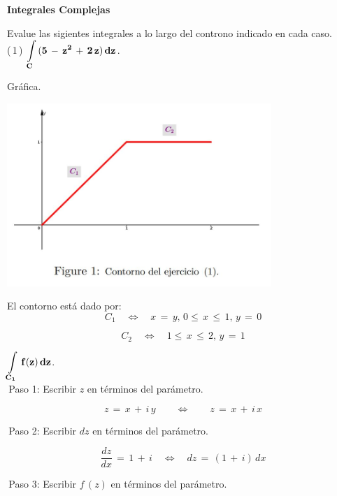 \documentclass[a4paper,11pt,openany]{book}
\begin{document}
\newpage


\graphicspath{ {images/} }

\begin{center}
\textbf{Integrales Complejas}
\end{center}

Evalue las sigientes integrales a lo largo del controno indicado en cada caso.\\

\textcolor{ao(english)}{(\,1\,)} $\bf{\displaystyle\int\limits_{C}\,(5\,-\,z^{2}\,+\,2\,z)\,dz}$.

\textcolor{ao(english)}{} Gráfica.

\begin{center}
     \includegraphics[width=10cm]{figura-1.JPG}
\end{center}

El contorno está dado por:\\

$$C_{1} \quad\iff\quad x\,=\,y,\,0\leq\,x\,\leq\,1,\,y\,=\,0$$

$$C_{2} \quad\iff\quad 1\leq\,x\,\leq\,2,\,y\,=\,1$$

$\bf{\displaystyle\int\limits_{C_{1}}\,f(z)\,dz}$.\\

\textcolor{ao(english)}{\,Paso 1:} Escribir $z$ en términos del parámetro.

$$z\,=\,x\,+\,i\,y \qquad\iff\qquad z\,=\,x\,+\,i\,x$$

\textcolor{ao(english)}{\,Paso 2:} Escribir $dz$ en términos del parámetro.

$$\dfrac{dz}{dx}\,=\,1\,+\,i \quad\iff\quad dz\,=\,(1\,+\,i)\,dx$$

\textcolor{ao(english)}{\,Paso 3:} Escribir $f\,(z)$ en términos del parámetro.
\end{document}
